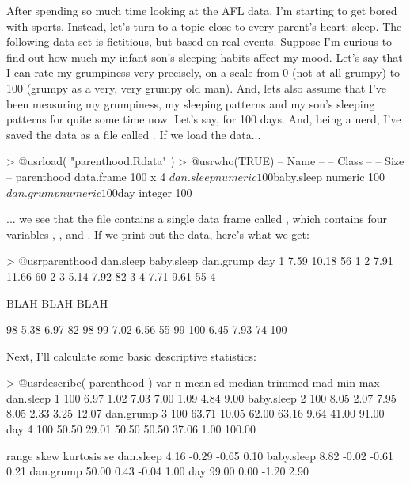 After spending so much time looking at the AFL data, I'm starting to get bored with sports. Instead, let's turn to a topic close to every parent's heart: sleep. The following data set is fictitious, but based on real events. Suppose I'm curious to find out how much my infant son's sleeping habits affect my mood. Let's say that I can rate my grumpiness very precisely, on a scale from 0 (not at all grumpy) to 100 (grumpy as a very, very grumpy old man). And, lets also assume that I've been measuring my grumpiness, my sleeping patterns and my son's sleeping patterns for quite some time now. Let's say, for 100 days. And, being a nerd, I've saved the data as a file called . If we load the data...
\begin{rblock1}
> @usr{load( "parenthood.Rdata" )}
> @usr{who(TRUE)}
   -- Name --     -- Class --   -- Size --
   parenthood     data.frame    100 x 4   
    $dan.sleep    numeric       100       
    $baby.sleep   numeric       100       
    $dan.grump    numeric       100       
    $day          integer       100         
\end{rblock1}
... we see that the file contains a single data frame called , which contains four variables , ,  and . If we print out the data, here's what we get:
\begin{rblock1}
> @usr{parenthood}
  dan.sleep baby.sleep dan.grump day
1      7.59      10.18        56   1
2      7.91      11.66        60   2
3      5.14       7.92        82   3
4      7.71       9.61        55   4

BLAH BLAH BLAH

98       5.38       6.97        82  98
99       7.02       6.56        55  99
100      6.45       7.93        74 100
\end{rblock1}
Next, I'll calculate some basic descriptive statistics:
\begin{rblock1}
> @usr{describe( parenthood )}
           var   n  mean    sd median trimmed   mad   min    max
dan.sleep    1 100  6.97  1.02   7.03    7.00  1.09  4.84   9.00
baby.sleep   2 100  8.05  2.07   7.95    8.05  2.33  3.25  12.07
dan.grump    3 100 63.71 10.05  62.00   63.16  9.64 41.00  91.00
day          4 100 50.50 29.01  50.50   50.50 37.06  1.00 100.00

           range  skew kurtosis   se
dan.sleep   4.16 -0.29    -0.65 0.10
baby.sleep  8.82 -0.02    -0.61 0.21
dan.grump  50.00  0.43    -0.04 1.00
day        99.00  0.00    -1.20 2.90
\end{rblock1}
